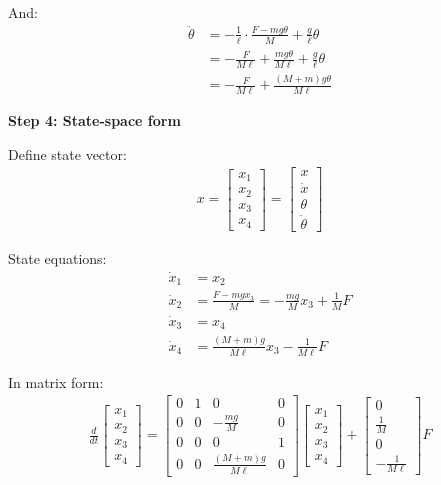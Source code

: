 \documentclass[11pt,a4paper]{article}
\begin{document}
And:
\begin{align}
  \ddot{\theta} &= -\frac{1}{\ell}\cdot\frac{F - mg\theta}{M} + \frac{g}{\ell}\theta \\
  &= -\frac{F}{M\ell} + \frac{mg\theta}{M\ell} + \frac{g}{\ell}\theta \\
  &= -\frac{F}{M\ell} + \frac{(M+m)g\theta}{M\ell}
\end{align}

\textbf{Step 4: State-space form}

Define state vector:
\begin{align}
  x = \begin{bmatrix} x_1 \\ x_2 \\ x_3 \\ x_4 \end{bmatrix} = \begin{bmatrix} x \\ \dot{x} \\ \theta \\ \dot{\theta} \end{bmatrix}
\end{align}

State equations:
\begin{align}
  \dot{x}_1 &= x_2 \\
  \dot{x}_2 &= \frac{F - mg x_3}{M} = -\frac{mg}{M}x_3 + \frac{1}{M}F \\
  \dot{x}_3 &= x_4 \\
  \dot{x}_4 &= \frac{(M+m)g}{M\ell}x_3 - \frac{1}{M\ell}F
\end{align}

In matrix form:
\begin{align}
  \frac{d}{dt}\begin{bmatrix} x_1 \\ x_2 \\ x_3 \\ x_4 \end{bmatrix} = \begin{bmatrix} 0 & 1 & 0 & 0 \\ 0 & 0 & -\frac{mg}{M} & 0 \\ 0 & 0 & 0 & 1 \\ 0 & 0 & \frac{(M+m)g}{M\ell} & 0 \end{bmatrix}\begin{bmatrix} x_1 \\ x_2 \\ x_3 \\ x_4 \end{bmatrix} + \begin{bmatrix} 0 \\ \frac{1}{M} \\ 0 \\ -\frac{1}{M\ell} \end{bmatrix}F
\end{align}
\end{document}

